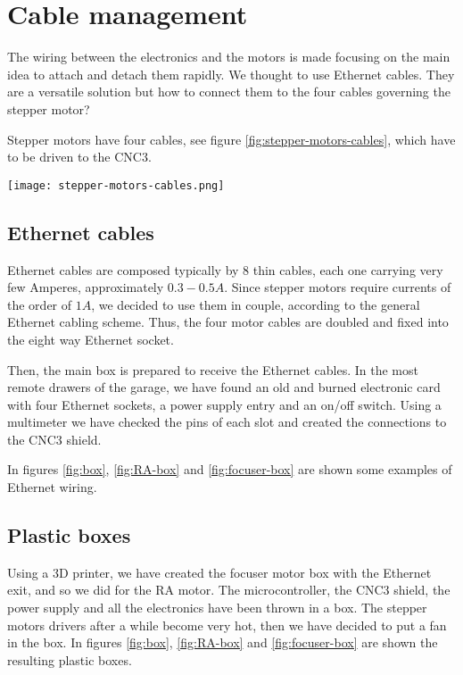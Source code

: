 \section{Cable management}
The wiring between the electronics and the motors is made focusing on the main idea to attach and detach them rapidly.
We thought to use Ethernet cables.
They are a versatile solution but how to connect them to the four cables governing the stepper motor?

Stepper motors have four cables, see figure \ref{fig:stepper-motors-cables}, which have to be driven to the CNC3.
\\
\begin{minipage}
    {0.5\textwidth}
    \centering
    \texttt{[image: stepper-motors-cables.png]}
    \label{fig:stepper-motors-cables}
\end{minipage}

\subsection{Ethernet cables}
Ethernet cables are composed typically by 8 thin cables, each one carrying very few Amperes, approximately \(0.3-0.5A\).
Since stepper motors require currents of the order of \(1A\), we decided to use them in couple, according to the general Ethernet cabling scheme.
Thus, the four motor cables are doubled and fixed into the eight way Ethernet socket.

Then, the main box is prepared to receive the Ethernet cables.
In the most remote drawers of the garage, we have found an old and burned electronic card with four Ethernet sockets, a power supply entry and an on/off switch.
Using a multimeter we have checked the pins of each slot and created the connections to the CNC3 shield.

In figures \ref{fig:box}, \ref{fig:RA-box} and \ref{fig:focuser-box} are shown some examples of Ethernet wiring.

\subsection{Plastic boxes}
Using a 3D printer, we have created the focuser motor box with the Ethernet exit, and so we did for the RA motor.
The microcontroller, the CNC3 shield, the power supply and all the electronics have been thrown in a box.
The stepper motors drivers after a while become very hot, then we have decided to put a fan in the box.
In figures \ref{fig:box}, \ref{fig:RA-box} and \ref{fig:focuser-box} are shown the resulting plastic boxes.

